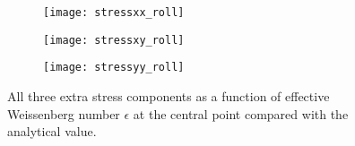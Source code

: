 \begin{figure}[htbp]
	\centering
	\begin{subfigure}{0.5\linewidth}
	\texttt{[image: stressxx\_roll]}
	\label{fig:stressxx_roll}
\end{subfigure}\medskip
\begin{subfigure}{0.5\linewidth}
	\texttt{[image: stressxy\_roll]}
	\label{fig:stressxy_roll}
\end{subfigure}\hfill
\begin{subfigure}{0.5\linewidth}
	\texttt{[image: stressyy\_roll]}
	\label{fig:stressyy_roll}
\end{subfigure}
\caption{All three extra stress components as a function of effective Weissenberg number $\epsilon$ at the central point compared with the analytical value.}
\label{fig:centerpoint_stress}
\end{figure}

